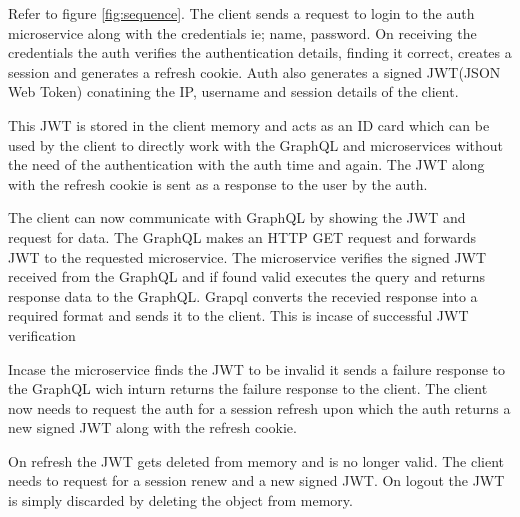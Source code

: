Refer to figure \ref{fig:sequence}.
The client sends a request to login to the auth microservice along with the credentials ie; name, password.
On receiving the credentials the auth verifies the authentication details, finding it correct, creates a session and generates a refresh cookie.
Auth also generates a signed JWT(JSON Web Token) conatining the IP, username and session details of the client.

This JWT is stored in the client memory and acts as an ID card which can be used by 
the client to directly work with the GraphQL and microservices without the need of 
the authentication with the auth time and again.
The JWT along with the refresh cookie is sent as a response to the user by the auth.

The client can now communicate with GraphQL by showing the JWT and request for data.
The GraphQL makes an HTTP GET request and forwards JWT to the requested microservice.
The microservice verifies the signed JWT received from the GraphQL and if found valid 
executes the query and returns response data to the GraphQL.
Grapql converts the recevied response into a required format and sends it to the client.
This is incase of successful JWT verification

Incase the microservice finds the JWT to be invalid it sends a failure response to the 
GraphQL wich inturn returns the failure response to the client.
The client now needs to request the auth for a session refresh upon which the auth 
returns a new signed JWT along with the refresh cookie.

On refresh the JWT gets deleted from memory and is no longer valid. The client needs 
to request for a session renew and a new signed JWT.
On logout the JWT is simply discarded by deleting the object from memory. 

